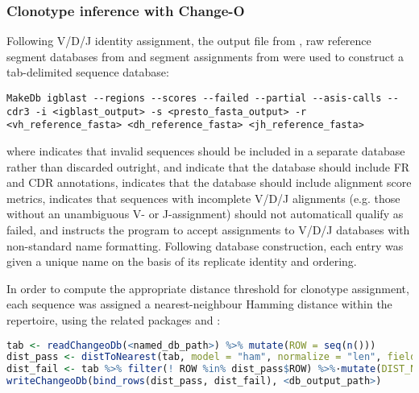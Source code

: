 {\subsubsection{Clonotype inference with Change-O}
\label{sec:methods_comp_igpreproc_clones}

Following V/D/J identity assignment, the output  file from , raw reference segment databases from  and segment assignments from  were used to construct a tab-delimited  sequence database:

\begin{lstlisting}
MakeDb igblast --regions --scores --failed --partial --asis-calls --cdr3 -i <igblast_output> -s <presto_fasta_output> -r <vh_reference_fasta> <dh_reference_fasta> <jh_reference_fasta>
\end{lstlisting}

\noindent where  indicates that invalid sequences should be included in a separate database rather than discarded outright,  and  indicate that the database should include FR and CDR annotations,  indicates that the database should include alignment score metrics,  indicates that sequences with incomplete V/D/J alignments (e.g. those without an unambiguous V- or J-assignment) should not automaticall qualify as failed, and  instructs the program to accept assignments to V/D/J databases with non-standard name formatting. Following database construction, each entry was given a unique name on the basis of its replicate identity and ordering. 

In order to compute the appropriate distance threshold for clonotype assignment, each sequence was assigned a nearest-neighbour Hamming distance within the repertoire, using the related  packages  and :

\begin{lstlisting}[language=R]
tab <- readChangeoDb(<named_db_path>) %>% mutate(ROW = seq(n()))
dist_pass <- distToNearest(tab, model = "ham", normalize = "len", fields = <group_field>, first = FALSE)
dist_fail <- tab %>% filter(! ROW %in% dist_pass$ROW) %>%·mutate(DIST_NEAREST = NA) 
writeChangeoDb(bind_rows(dist_pass, dist_fail), <db_output_path>)
\end{lstlisting}

}

